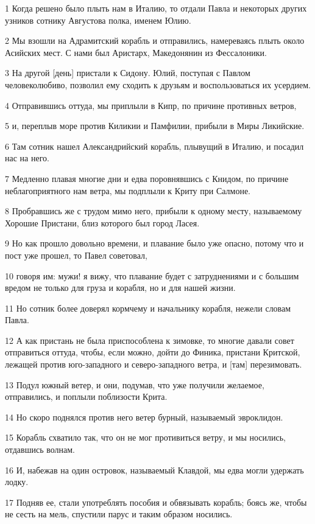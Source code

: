 \par 1 Когда решено было плыть нам в Италию, то отдали Павла и некоторых других узников сотнику Августова полка, именем Юлию.
\par 2 Мы взошли на Адрамитский корабль и отправились, намереваясь плыть около Асийских мест. С нами был Аристарх, Македонянин из Фессалоники.
\par 3 На другой [день] пристали к Сидону. Юлий, поступая с Павлом человеколюбиво, позволил ему сходить к друзьям и воспользоваться их усердием.
\par 4 Отправившись оттуда, мы приплыли в Кипр, по причине противных ветров,
\par 5 и, переплыв море против Киликии и Памфилии, прибыли в Миры Ликийские.
\par 6 Там сотник нашел Александрийский корабль, плывущий в Италию, и посадил нас на него.
\par 7 Медленно плавая многие дни и едва поровнявшись с Книдом, по причине неблагоприятного нам ветра, мы подплыли к Криту при Салмоне.
\par 8 Пробравшись же с трудом мимо него, прибыли к одному месту, называемому Хорошие Пристани, близ которого был город Ласея.
\par 9 Но как прошло довольно времени, и плавание было уже опасно, потому что и пост уже прошел, то Павел советовал,
\par 10 говоря им: мужи! я вижу, что плавание будет с затруднениями и с большим вредом не только для груза и корабля, но и для нашей жизни.
\par 11 Но сотник более доверял кормчему и начальнику корабля, нежели словам Павла.
\par 12 А как пристань не была приспособлена к зимовке, то многие давали совет отправиться оттуда, чтобы, если можно, дойти до Финика, пристани Критской, лежащей против юго-западного и северо-западного ветра, и [там] перезимовать.
\par 13 Подул южный ветер, и они, подумав, что уже получили желаемое, отправились, и поплыли поблизости Крита.
\par 14 Но скоро поднялся против него ветер бурный, называемый эвроклидон.
\par 15 Корабль схватило так, что он не мог противиться ветру, и мы носились, отдавшись волнам.
\par 16 И, набежав на один островок, называемый Клавдой, мы едва могли удержать лодку.
\par 17 Подняв ее, стали употреблять пособия и обвязывать корабль; боясь же, чтобы не сесть на мель, спустили парус и таким образом носились.
